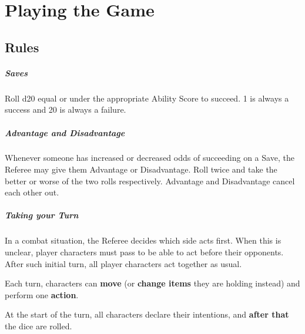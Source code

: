 \documentclass[itdr]{subfiles}
\begin{document}
\cleartoleftpage

\chapter{Playing the Game}
\label{ch:playing_the_game}

\section{Rules}

\paragraph{Saves}
Roll d20 equal or under the appropriate Ability Score to succeed. 1 is always a success and 20 is \mbox{always} a failure.

\vfill

\paragraph{Advantage and Disadvantage}
Whenever someone has increased or decreased odds of succeeding on a Save, the Referee may give them Advantage or Disadvantage. Roll twice and take the better or worse of the two rolls respectively. Advantage and Disadvantage cancel each other out.

\vfill

\paragraph{Taking your Turn}
In a combat situation, the Referee decides which side acts first. When this is unclear, player characters must pass  to be able to act before their opponents. After such initial turn, all player characters act together as usual.

Each turn, characters can \textbf{move} (or \textbf{change items} they are holding instead) and perform one \textbf{action}.

At the start of the turn, all characters declare their \mbox{intentions}, and \textbf{after that} the dice are rolled.

\begin{comment}
On their turn, characters can generally \textbf{move} (or \textbf{change items} they are holding instead) and \textbf{then} carry out one \textbf{action}. All characters declare their \mbox{intentions} and \textbf{after that} the dice are rolled.
\end{comment}
\end{document}
